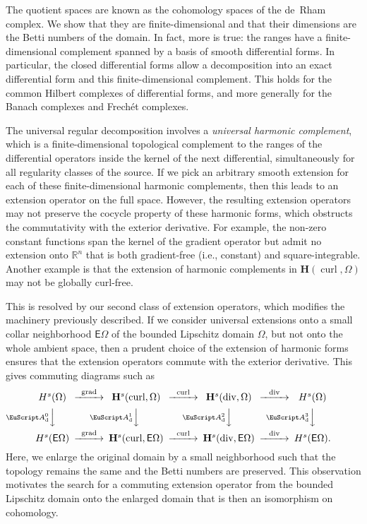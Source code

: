 \documentclass[10pt,a4paper]{amsart}
\theoremstyle{definition}
\theoremstyle{remark}
\numberwithin{equation}{section}
\newcommand{\bbR}{{\mathbb R}}
\newcommand{\bfH}{{\mathbf H}}
\newcommand{\euA}{{\EuScript A}}
\newcommand{\sfE}{{\mathsf E}}
\newcommand{\cartan}{{\mathrm d}}
\newcommand{\Domain}{{\Omega}}
\newcommand{\extDomain}{{\sfE\Omega}}
\newcommand{\kommErweiterung}{\euA_{\cartan}}
\newcommand{\grad}{\operatorname{grad}}
\newcommand{\curl}{\operatorname{curl}}
\newcommand{\divergence}{\operatorname{div}}
\begin{document}
The quotient spaces are known as the cohomology spaces of the de~Rham complex.
We show that they are finite-dimensional and that their dimensions are the Betti numbers of the domain. 
In fact, more is true: the ranges have a finite-dimensional complement spanned by a basis of smooth differential forms. 
In particular, the closed differential forms allow a decomposition into an exact differential form and this finite-dimensional complement.
This holds for the common Hilbert complexes of differential forms, and more generally for the Banach complexes and Frech\'et complexes. 

The universal regular decomposition involves a \emph{universal harmonic complement}, which is a finite-dimensional topological complement to the ranges of the differential operators inside the kernel of the next differential, simultaneously for all regularity classes of the source.
If we pick an arbitrary smooth extension for each of these finite-dimensional harmonic complements, 
then this leads to an extension operator on the full space. 
However, the resulting extension operators may not preserve the cocycle property of these harmonic forms, which obstructs the commutativity with the exterior derivative. 
For example, the non-zero constant functions span the kernel of the gradient operator but admit no extension onto $\bbR^{n}$ that is both gradient-free (i.e., constant) and square-integrable. Another example is that the extension of harmonic complements in $\bfH(\curl,\Domain)$ may not be globally curl-free.

This is resolved by our second class of extension operators, which modifies the machinery previously described.
If we consider universal extensions onto a small collar neighborhood $\extDomain$ of the bounded Lipschitz domain $\Domain$, but not onto the whole ambient space, 
then a prudent choice of the extension of harmonic forms ensures that the extension operators commute with the exterior derivative.
This gives commuting diagrams such as 
\begin{align*}
    \begin{CD}
        H^{s}(\Domain) @>\grad>> \bfH^{s}(\curl,\Domain) @>\curl>> \bfH^{s}(\divergence,\Domain) @>\divergence>> H^{s}(\Domain)
        \\
        @V{\kommErweiterung^{0}}VV 
        @V{\kommErweiterung^{1}}VV 
        @V{\kommErweiterung^{2}}VV 
        @V{\kommErweiterung^{3}}VV
        \\
        H^{s}(\extDomain) @>\grad>> \bfH^{s}(\curl,\extDomain) @>\curl>> \bfH^{s}(\divergence,\extDomain) @>\divergence>> H^{s}(\extDomain).
    \end{CD}
\end{align*}
Here, we enlarge the original domain by a small neighborhood such that the topology remains the same and the Betti numbers are preserved. 
This observation motivates the search for a commuting extension operator from the bounded Lipschitz domain onto the enlarged domain that is then an isomorphism on cohomology. 
\end{document}
